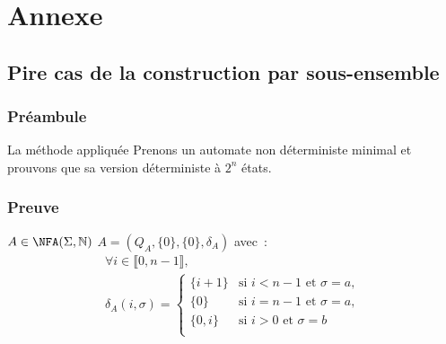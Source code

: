 
\appendix

\section{Annexe}


\subsection{Pire cas de la construction par sous-ensemble}

\subsubsection{Préambule}

\begin{frame}{\myframetitle}\label{pcse}
  \begin{block}{La méthode appliquée}
    Prenons un automate non déterministe minimal et prouvons que sa version
    déterministe à \(2^n\) états.
  \end{block}
\end{frame}

\subsubsection{Preuve}

\begin{frame}{\myframetitle}
  \begin{block}{\(A \in \NFA(\Sigma, \mathbb{N})\)}
    \(A = (Q_A, \{0\}, \{0\}, \delta_A)\) avec~:
    \begin{gather*}
      \forall i \in \llbracket 0, n - 1 \rrbracket, \\
      \delta_A(i, \sigma) =
      \begin{cases}
        \{i + 1\} &\text{si } i < n - 1 \text{ et } \sigma = a, \\
        \{0\} &\text{si } i = n - 1 \text{ et } \sigma = a, \\
        \{0, i\} &\text{si } i > 0 \text{ et } \sigma = b \\
      \end{cases}
    \end{gather*}
  \end{block}
\end{frame}

